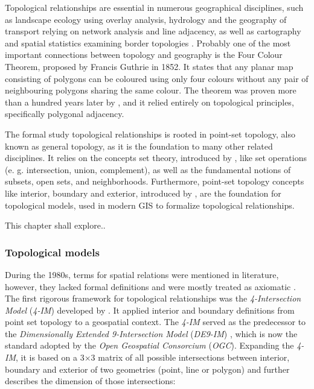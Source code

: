 \documentclass[
  english,
  12pt,
  a4paper,
]{article}
\begin{document}
Topological relationships are essential in numerous geographical
disciplines, such as landscape ecology using overlay analysis, hydrology
and the geography of transport relying on network analysis and line
adjacency, as well as cartography and spatial statistics examining
border topologies \citep{papadimitriou_geo-topology_2023}. Probably one
of the most important connections between topology and geography is the
Four Colour Theorem, proposed by Francis Guthrie in 1852. It states that
any planar map consisting of polygons can be coloured using only four
colours without any pair of neighbouring polygons sharing the same
colour. The theorem was proven more than a hundred years later by
\citet{appel1977fourcolor1}, and it relied entirely on topological
principles, specifically polygonal adjacency.

The formal study topological relationships is rooted in point-set
topology, also known as general topology, as it is the foundation to
many other related disciplines. It relies on the concepts set theory,
introduced by \citet{cantor1874}, like set operations (e. g.
intersection, union, complement), as well as the fundamental notions of
subsets, open sets, and neighborhoods. Furthermore, point-set topology
concepts like interior, boundary and exterior, introduced by
\citet{hausdorff1914grundzuge}, are the foundation for topological
models, used in modern GIS to formalize topological relationships.

This chapter shall explore..

\subsubsection{Topological models}\label{topological-models}

During the 1980s, terms for spatial relations were mentioned in
literature, however, they lacked formal definitions and were mostly
treated as axiomatic \citep{egenhoferPointsetTopologicalSpatial1991}.
The first rigorous framework for topological relationships was the
\emph{4-Intersection Model} (\emph{4-IM}) developed by
\citet{egenhoferPointsetTopologicalSpatial1991}. It applied interior and
boundary definitions from point set topology to a geospatial context.
The \emph{4-IM} served as the predecessor to the \emph{Dimensionally
Extended 9-Intersection Model} (\emph{DE9-IM})
\citep{clementiniSmallSetFormal1993}, which is now the standard adopted
by the \emph{Open Geospatial Consorcium} (\emph{OGC}). Expanding the
\emph{4-IM}, it is based on a 3×3 matrix of all possible intersections
between interior, boundary and exterior of two geometries (point, line
or polygon) and further describes the dimension of those intersections:
\end{document}
